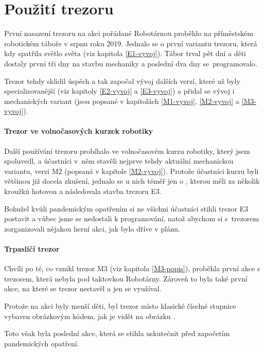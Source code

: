 
\section{Použití trezoru}
První nasazení trezoru na akci pořádané Robotárnou \parencite{robotarna} proběhlo na příměstském robotickém táboře v srpnu roku 2019.
Jednalo se o první variantu trezoru, která kdy spatřila světlo světa (viz kapitola \ref{E1-vyvoj}). Tábor trval pět dní a děti dostaly první tři dny na stavbu mechaniky a poslední dva dny 
se~programovalo. 

Trezor tehdy sklidil úspěch a tak započal vývoj dalších verzí, které už byly specializovanější (viz kapitoly \ref{E2-vyvoj} a  \ref{E3-vyvoj}) a přidal se vývoj i mechanických
variant (jsou popsané v kapitolách \ref{M1-vyvoj}, \ref{M2-vyvoj} a \ref{M3-vyvoj}).

\paragraph{Trezor ve volnočasových kurzek robotiky}
Další používání trezoru pro\-bí\-ha\-lo ve volnočasovém kurzu robotiky, který jsem spoluvedl, a účastníci v~něm stavěli nejprve tehdy aktuální mechanickou variantu, verzi M2 (popsaná v kapitole \ref{M2-vyvoj}).
Protože účastníci kurzu byli většinou již docela zkušení, jednalo se u nich téměř jen o , kterou měli za několik kroužků hotovou a následovala stavba trezoru E3. 

Bohužel kvůli pandemickým opatřením si ne všichni účastníci stihli trezor E3 postavit a vůbec jsme se nedostali k programování, natož abychom si s~trezorem zorganizovali nějakou herní akci, 
jak bylo dříve v plánu.

\paragraph{Trpasličí trezor}
Chvíli po té, co vznikl trezor M3 (viz kapitola \ref{M3-popis}), proběhla první akce s trezorem, která nebyla pod taktovkou Robotárny. Zároveň to byla také 
první akce, na které se trezor nestavěl a jen se využíval.

Protože na akci byly menší děti, byl trezor místo klasické číselné stupnice vybaven obrázkovým kódem, jak je vidět na obrázku . %

Toto však byla poslední akce, která se stihla uskutečnit před započetím pandemických opatření.

